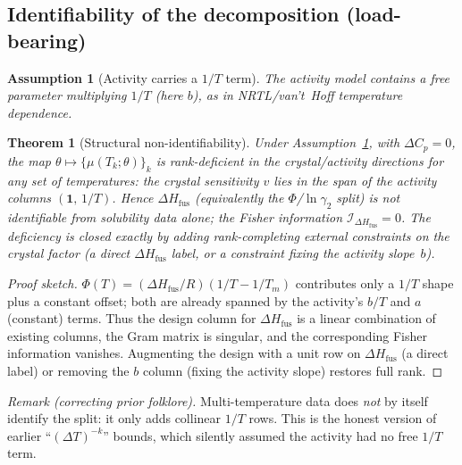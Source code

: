 \documentclass[11pt]{article}
\newtheorem{theorem}{Theorem}
\newtheorem{assumption}{Assumption}
\newcommand{\Phicry}{\Phi}
\newcommand{\dHfus}{\Delta H_{\mathrm{fus}}}
\newcommand{\Tm}{T_m}
\newcommand{\lng}{\ln\gamma_2}
\newcommand{\Rgas}{R}
\begin{document}
\subsection{Identifiability of the decomposition (load-bearing)}
\begin{assumption}[Activity carries a $1/T$ term]\label{asm:b}
The activity model contains a free parameter multiplying $1/T$ (here $b$), as in
NRTL/van't~Hoff temperature dependence.
\end{assumption}

\begin{theorem}[Structural non-identifiability]\label{thm:ident}
Under Assumption~\ref{asm:b}, with $\Delta C_p=0$, the map
$\theta\mapsto\{\mu(T_k;\theta)\}_k$ is rank-deficient in the crystal/activity
directions for any set of temperatures: the crystal sensitivity $v$ lies in the
span of the activity columns $(\mathbf 1,\,1/T)$. Hence $\dHfus$ (equivalently
the $\Phicry$/$\lng$ split) is not identifiable from solubility data alone; the
Fisher information $\mathcal I_{\dHfus}=0$. The deficiency is closed exactly by
adding rank-completing external constraints on the crystal factor (a direct
$\dHfus$ label, or a constraint fixing the activity slope~$b$).
\end{theorem}
\begin{proof}[Proof sketch]
$\Phicry(T)=(\dHfus/\Rgas)(1/T-1/\Tm)$ contributes only a $1/T$ shape plus a
constant offset; both are already spanned by the activity's $b/T$ and $a$
(constant) terms. Thus the design column for $\dHfus$ is a linear combination of
existing columns, the Gram matrix is singular, and the corresponding Fisher
information vanishes. Augmenting the design with a unit row on $\dHfus$ (a direct
label) or removing the $b$ column (fixing the activity slope) restores full rank.
\end{proof}

\noindent\emph{Remark (correcting prior folklore).} Multi-temperature data does
\emph{not} by itself identify the split: it only adds collinear $1/T$ rows. This
is the honest version of earlier ``$(\Delta T)^{-k}$'' bounds, which silently
assumed the activity had no free $1/T$ term.
\end{document}

